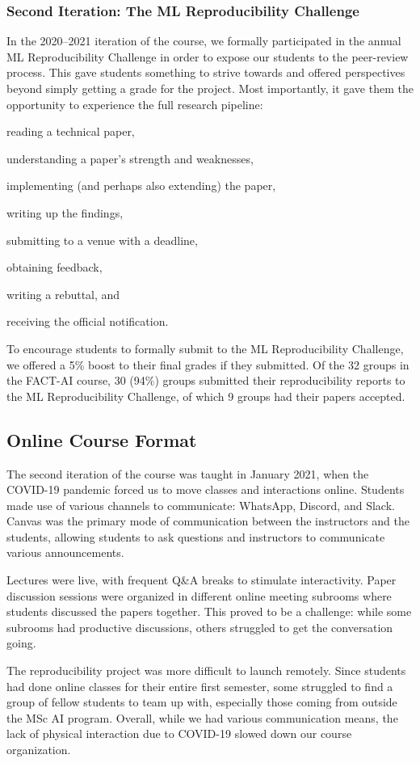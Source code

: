 \subsubsection{Second Iteration: The ML Reproducibility Challenge}
In the 2020--2021 iteration of the course, we formally participated in the annual ML Reproducibility Challenge \citep{paperswithcode2020} in order to expose our students to the peer-review process. 
This gave students something to strive towards and offered perspectives beyond simply getting a grade for the project. 
Most importantly, it gave them the opportunity to experience the full research pipeline: 
\begin{enumerate*}[label=(\roman*)]
	\item reading a technical paper, 
	\item understanding a paper's strength and weaknesses, 
	\item implementing (and perhaps also extending) the paper, 
	\item writing up the findings, 
	\item submitting to a venue with a deadline, 
	\item obtaining feedback, 
	\item writing a rebuttal, and
	\item receiving the official notification. 
\end{enumerate*}
To encourage students to formally submit to the ML Reproducibility Challenge, we offered a 5\% boost to their final grades if they submitted. 
Of the 32 groups in the FACT-AI course, 30 (94\%) groups submitted their reproducibility reports to the ML Reproducibility Challenge, of which 9 groups had their papers accepted.

\subsection{Online Course Format}
The second iteration of the course was taught in January 2021, when the COVID-19 pandemic forced us to move classes and interactions online. 
Students made use of various channels to communicate: WhatsApp, Discord, and Slack.  
Canvas was the primary mode of communication between the instructors and the students, allowing students to ask questions and instructors to communicate various announcements. 

Lectures were live, with frequent Q\&A breaks to stimulate interactivity. 
Paper discussion sessions were organized in different online meeting subrooms where students discussed the papers together.  
This proved to be a challenge: while some subrooms had productive discussions, others struggled to get the conversation going. 

The reproducibility project was more difficult to launch remotely. 
Since students had done online classes for their entire first semester, some struggled to find a group of fellow students to team up with, especially those coming from outside the MSc AI program. 
Overall, while we had various communication means, the lack of physical interaction due to COVID-19 slowed down our course organization. 
